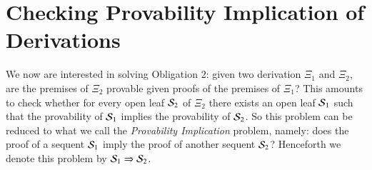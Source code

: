 \documentclass{new_tlp}
\newcommand\dnot{\ensuremath{\mathit{not}}\xspace}
\newcommand{\In}[2]{\ensuremath{\tsl{in}(\ensuremath{#1},\ensuremath{#2})}}
\begin{document}


\section{Checking Provability Implication of Derivations}
\label{sec:provIf}

We now are interested in solving Obligation 2: given two derivation $\Xi_1$
and $\Xi_2$, are the premises of $\Xi_2$ provable given proofs of the premises
of $\Xi_1$? This amounts to check whether for every open leaf $\Sscr_2$ of $\Xi_2$
there exists an open leaf $\Sscr_1$ such that the provability of $\Sscr_1$ implies the
provability of $\Sscr_2$. So this problem can be reduced to what we call the
\emph{Provability Implication} problem, namely: does the proof of a sequent
$\Sscr_1$ imply the proof of another sequent $\Sscr_2$? Henceforth we denote this
problem by $\Sscr_1 \Rightarrow \Sscr_2$.
\end{document}
